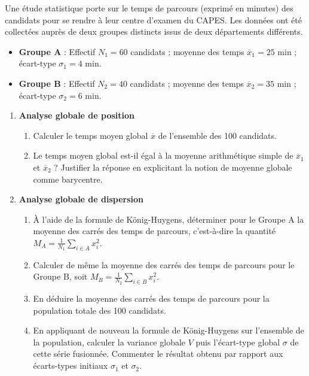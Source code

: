 \documentclass[11pt,a4paper]{article}
\begin{document}
Une étude statistique porte sur le temps de parcours (exprimé en minutes) des candidats pour se rendre à leur centre d'examen du CAPES. Les données ont été collectées auprès de deux groupes distincts issus de deux départements différents.

\begin{itemize}
    \item \textbf{Groupe A} : Effectif $N_1 = 60$ candidats ; moyenne des temps $\overline{x}_1 = 25$ min ; écart-type $\sigma_1 = 4$ min.
    \item \textbf{Groupe B} : Effectif $N_2 = 40$ candidats ; moyenne des temps $\overline{x}_2 = 35$ min ; écart-type $\sigma_2 = 6$ min.
\end{itemize}

\begin{enumerate}
    \item \textbf{Analyse globale de position}
    \begin{enumerate}
        \item Calculer le temps moyen global $\overline{x}$ de l'ensemble des 100 candidats.
        \item Le temps moyen global est-il égal à la moyenne arithmétique simple de $\overline{x}_1$ et $\overline{x}_2$ ? Justifier la réponse en explicitant la notion de moyenne globale comme barycentre.
    \end{enumerate}

    \item \textbf{Analyse globale de dispersion}
    \begin{enumerate}
        \item À l'aide de la formule de König-Huygens, déterminer pour le Groupe A la moyenne des carrés des temps de parcours, c'est-à-dire la quantité $M_A = \frac{1}{N_1}\sum_{i \in A} x_i^2$. 
        \item Calculer de même la moyenne des carrés des temps de parcours pour le Groupe B, soit $M_B = \frac{1}{N_2}\sum_{i \in B} x_i^2$.
        \item En déduire la moyenne des carrés des temps de parcours pour la population totale des 100 candidats.
        \item En appliquant de nouveau la formule de König-Huygens sur l'ensemble de la population, calculer la variance globale $V$ puis l'écart-type global $\sigma$ de cette série fusionnée. Commenter le résultat obtenu par rapport aux écarts-types initiaux $\sigma_1$ et $\sigma_2$.
    \end{enumerate}
\end{enumerate}
\end{document}
